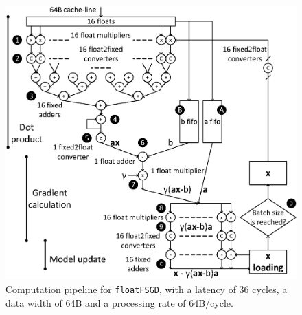\documentclass{article}
\begin{document}
\begin{figure}[t]
\centering
\includegraphics[width=.8\columnwidth]{Figures/floatFPGASGD.eps}
\caption{Computation pipeline for \texttt{floatFSGD}, with a latency of 36 cycles, a data width of 64B and a processing rate of 64B/cycle.}
\label{fig:floatFPGASGD}
\end{figure}
\end{document}
